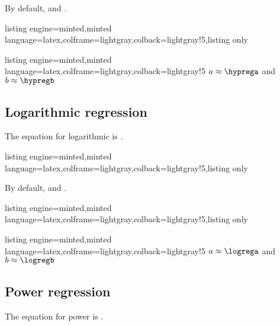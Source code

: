\documentclass[11pt,a4paper]{ltxdoc}
\begin{document}
By default,  and .

\begin{tcblisting}{listing engine=minted,minted language=latex,colframe=lightgray,colback=lightgray!5,listing only}
\def\LLX{83,71,64,69,69,64,68,59,81,91,57,65,58,62}%
\def\LLY{183,168,171,178,176,172,165,158,183,182,163,175,164,175}%
\end{tcblisting}

\begin{tcblisting}{listing engine=minted,minted language=latex,colframe=lightgray,colback=lightgray!5}
\xinthypreg[round=2]{\LLX}{\LLY}%
$a \approx \hyprega$ and $b \approx \hypregb$
\end{tcblisting}

\subsection{Logarithmic regression}

The equation for logarithmic is .

\begin{tcblisting}{listing engine=minted,minted language=latex,colframe=lightgray,colback=lightgray!5,listing only}
\end{tcblisting}

By default,  and .

\begin{tcblisting}{listing engine=minted,minted language=latex,colframe=lightgray,colback=lightgray!5,listing only}
\def\LLX{83,71,64,69,69,64,68,59,81,91,57,65,58,62}%
\def\LLY{183,168,171,178,176,172,165,158,183,182,163,175,164,175}%
\end{tcblisting}

\begin{tcblisting}{listing engine=minted,minted language=latex,colframe=lightgray,colback=lightgray!5}
\xintlogreg[round=1/4]{\LLX}{\LLY}%
$a \approx \logrega$ and $b \approx \logregb$
\end{tcblisting}

\subsection{Power regression}

The equation for power is .
\end{document}
